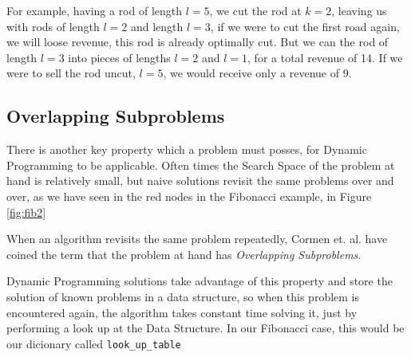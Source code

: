 For example, having a rod of length $l = 5$, we cut the rod at $k = 2$, leaving us with rods of length
$l = 2$ and length $l = 3$, if we were to cut the first road again, we will loose revenue, this rod is already
optimally cut. But we can the rod of length $l = 3$ into pieces of lengths $l = 2$ and $l = 1$, for a total revenue of
14. If we were to sell the rod uncut, $l = 5$,  we would receive only a revenue of 9.


\subsection{Overlapping Subproblems}

There is another key property which a problem must posses, for Dynamic Programming to
be applicable. Often times the Search Space of the problem at hand is relatively small,
but naive solutions revisit the same problems over and over, as we have seen in the red
nodes in the Fibonacci example, in Figure \ref{fig:fib2}

When an algorithm revisits the same problem repeatedly, Cormen et. al. have coined the term
that the problem at hand has \emph{Overlapping Subproblems}.

Dynamic Programming solutions take advantage of this property and store the solution
of known problems in a data structure, so when this problem is encountered again, 
the algorithm takes constant time solving it, just by performing a look up at the Data
Structure. In our Fibonacci case, this would be our dicionary called \texttt{look\_up\_table}